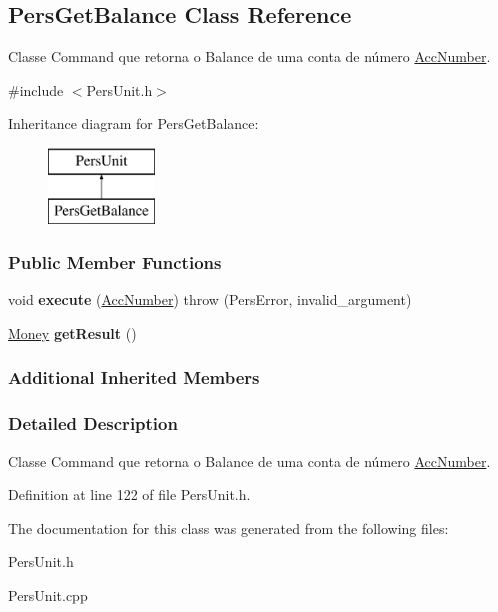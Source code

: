 \hypertarget{classPersGetBalance}{\subsection{Pers\-Get\-Balance Class Reference}
\label{d3/d71/classPersGetBalance}
}


Classe Command que retorna o Balance de uma conta de número \hyperlink{classAccNumber}{Acc\-Number}.  




{\ttfamily \#include $<$Pers\-Unit.\-h$>$}

Inheritance diagram for Pers\-Get\-Balance\-:\begin{figure}[H]
\begin{center}
\leavevmode
\includegraphics[height=2.000000cm]{d3/d71/classPersGetBalance}
\end{center}
\end{figure}
\subsubsection*{Public Member Functions}
\begin{DoxyCompactItemize}
\item 
\hypertarget{classPersGetBalance_a265f69b7d01b99c252f421eec95dcedb}{void {\bfseries execute} (\hyperlink{classAccNumber}{Acc\-Number})  throw (\-Pers\-Error, invalid\-\_\-argument)}\label{d3/d71/classPersGetBalance_a265f69b7d01b99c252f421eec95dcedb}

\item 
\hypertarget{classPersGetBalance_a4df3579dbede5f9c38d25c1b937c88e7}{\hyperlink{classMoney}{Money} {\bfseries get\-Result} ()}\label{d3/d71/classPersGetBalance_a4df3579dbede5f9c38d25c1b937c88e7}

\end{DoxyCompactItemize}
\subsubsection*{Additional Inherited Members}


\subsubsection{Detailed Description}
Classe Command que retorna o Balance de uma conta de número \hyperlink{classAccNumber}{Acc\-Number}. 

Definition at line 122 of file Pers\-Unit.\-h.



The documentation for this class was generated from the following files\-:\begin{DoxyCompactItemize}
\item 
Pers\-Unit.\-h\item 
Pers\-Unit.\-cpp\end{DoxyCompactItemize}
